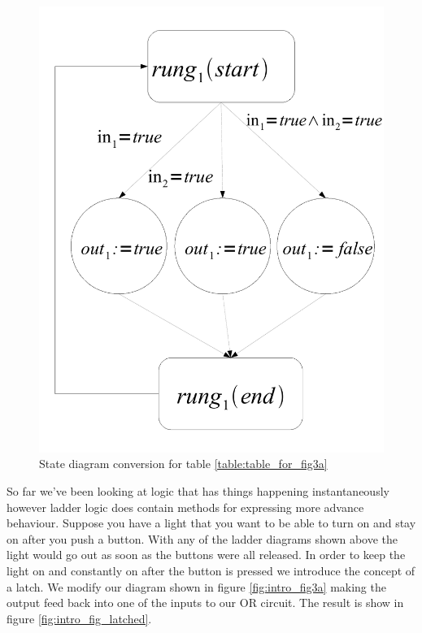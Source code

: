 \begin{figure}[h]
    \centering
    \includegraphics[width=\imgmedsmall]{./images/intro_or_graph_3a.pdf} %
    \caption{State diagram conversion for table \ref{table:table_for_fig3a}}
    \label{fig:intro_or_graph_3a}
\end{figure}

So far we've been looking at logic that has things happening instantaneously however ladder logic does contain methods for expressing more advance behaviour. Suppose you have a light that you want to be able to turn on and stay on after you push a button. With any of the ladder diagrams shown above the light would go out as soon as the buttons were all released. In order to keep the light on and constantly on after the button is pressed we introduce the concept of a latch. We modify our diagram shown in figure \ref{fig:intro_fig3a} making the output feed back into one of the inputs to our OR circuit. The result is show in figure \ref{fig:intro_fig_latched}.


